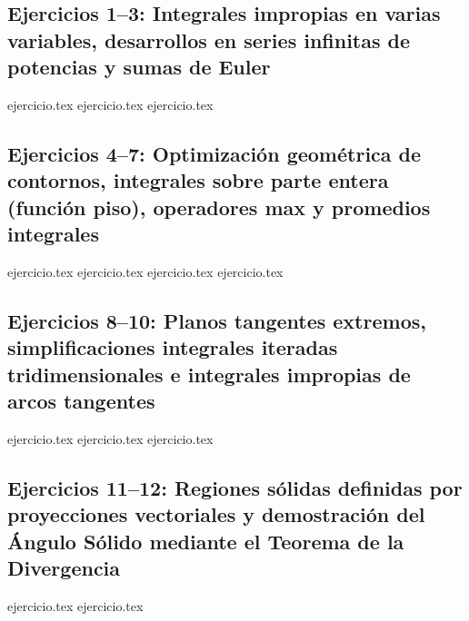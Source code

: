 
\subsection*{Ejercicios 1--3: Integrales impropias en varias variables, desarrollos en series infinitas de potencias y sumas de Euler}
\begin{enumerate}
    {ejercicio.tex}
    {ejercicio.tex}
    {ejercicio.tex}
\end{enumerate}

\subsection*{Ejercicios 4--7: Optimización geométrica de contornos, integrales sobre parte entera (función piso), operadores max y promedios integrales}
\begin{enumerate}
    \setcounter{enumi}{3}
    {ejercicio.tex}
    {ejercicio.tex}
    {ejercicio.tex}
    {ejercicio.tex}
\end{enumerate}

\subsection*{Ejercicios 8--10: Planos tangentes extremos, simplificaciones integrales iteradas tridimensionales e integrales impropias de arcos tangentes}
\begin{enumerate}
    \setcounter{enumi}{7}
    {ejercicio.tex}
    {ejercicio.tex}
    {ejercicio.tex}
\end{enumerate}

\subsection*{Ejercicios 11--12: Regiones sólidas definidas por proyecciones vectoriales y demostración del Ángulo Sólido mediante el Teorema de la Divergencia}
\begin{enumerate}
    \setcounter{enumi}{10}
    {ejercicio.tex}
    {ejercicio.tex}
\end{enumerate}
